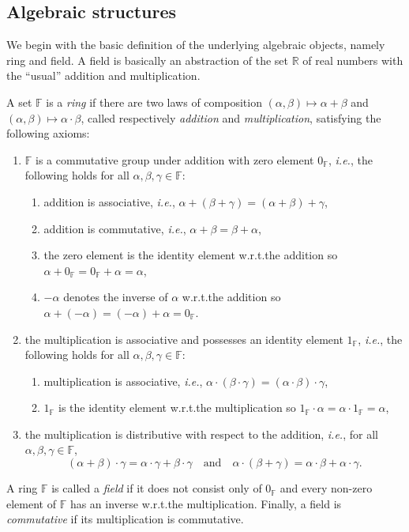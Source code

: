 \documentclass[a4paper]{paper}
\newcommand{\Field}{\mathbb{F}}
\newcommand{\Real}{\mathbb{R}}
\newcommand{\ie}{\textsl{i.e.}\xspace}
\begin{document}
\subsection{Algebraic structures}
We begin with the basic definition of the underlying algebraic objects, namely ring and field.
A field is basically an abstraction of the set $\Real$ of real numbers with the ``usual'' 
addition and multiplication.
\begin{definition}
  A set $\Field$ is a \emph{ring} if there are two laws of composition
  $(\alpha,\beta)\mapsto \alpha+\beta$ and $(\alpha,\beta) \mapsto \alpha\cdot \beta$, called 
  respectively \emph{addition} and \emph{multiplication}, satisfying the following axioms:
  \begin{enumerate}
  \item $\Field$ is a commutative group under addition with zero element $0_{\Field}$, \ie,
    the following holds for all $\alpha,\beta,\gamma\in \Field$:
    \begin{enumerate}
    \item addition is associative, \ie, $\alpha + (\beta+\gamma)=(\alpha+\beta)+\gamma$,
    \item addition is commutative, \ie, $\alpha + \beta = \beta+\alpha$,
    \item the zero element is the identity element w.r.t.\@ the addition so 
       $\alpha+0_{\Field}=0_{\Field}+\alpha=\alpha$,
    \item $-\alpha$ denotes the inverse of $\alpha$  w.r.t.\@ the addition so 
       $\alpha+(-\alpha)=(-\alpha)+\alpha=0_{\Field}$.
    \end{enumerate}
  \item the multiplication is associative and possesses an identity element $1_{\Field}$, \ie,
    the following holds for all $\alpha,\beta,\gamma\in \Field$:
    \begin{enumerate}
    \item multiplication is associative, \ie, 
      $\alpha\cdot (\beta\cdot \gamma)=(\alpha\cdot \beta)\cdot \gamma$,
   \item $1_{\Field}$ is the identity element w.r.t.\@ the multiplication so 
      $1_{\Field}\cdot \alpha=\alpha \cdot 1_{\Field}=\alpha$, 
  \end{enumerate}
  \item the multiplication is distributive with respect to the addition, \ie,
    for all $\alpha,\beta,\gamma\in \Field$,
    \[ (\alpha+\beta)\cdot \gamma = \alpha \cdot \gamma+\beta\cdot\gamma 
       \quad\text{and}\quad
       \alpha \cdot (\beta + \gamma) = \alpha \cdot \beta+\alpha\cdot\gamma.
    \]
  \end{enumerate}
  A ring $\Field$ is called a \emph{field} if it does not consist only of $0_{\Field}$ and every non-zero 
  element of $\Field$ has an inverse w.r.t.\@ the multiplication. Finally, a field is \emph{commutative}
  if its multiplication is commutative.
\end{definition}
\end{document}
